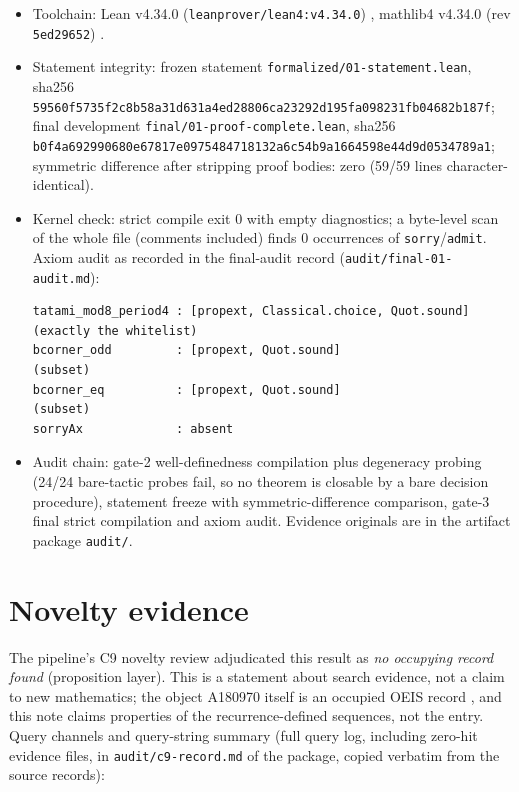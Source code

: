 \documentclass[11pt]{article}
\begin{document}
\begin{itemize}
\item Toolchain: Lean v4.34.0 (\texttt{leanprover/lean4:v4.34.0})
\cite{lean4}, mathlib4 v4.34.0 (rev \texttt{5ed29652}) \cite{mathlib}.
\item Statement integrity: frozen statement
\texttt{formalized/01-statement.lean}, sha256
\texttt{59560f5735f2c8b58a31d631a4ed28806ca23292d195fa098231fb04682b187f};
final development \texttt{final/01-proof-complete.lean}, sha256
\texttt{b0f4a692990680e67817e0975484718132a6c54b9a1664598e44d9d0534789a1};
symmetric difference after stripping proof bodies: zero (59/59 lines
character-identical).
\item Kernel check: strict compile exit 0 with empty diagnostics; a
byte-level scan of the whole file (comments included) finds 0 occurrences of
\texttt{sorry}/\texttt{admit}. Axiom audit as recorded in the final-audit
record (\texttt{audit/final-01-audit.md}):
\begin{verbatim}
tatami_mod8_period4 : [propext, Classical.choice, Quot.sound]  (exactly the whitelist)
bcorner_odd         : [propext, Quot.sound]                    (subset)
bcorner_eq          : [propext, Quot.sound]                    (subset)
sorryAx             : absent
\end{verbatim}
\item Audit chain: gate-2 well-definedness compilation plus degeneracy
probing (24/24 bare-tactic probes fail, so no theorem is closable by a bare
decision procedure), statement freeze with symmetric-difference comparison,
gate-3 final strict compilation and axiom audit. Evidence originals are in
the artifact package \texttt{audit/}.
\end{itemize}

\section{Novelty evidence}

The pipeline's C9 novelty review adjudicated this result as \emph{no
occupying record found} (proposition layer). This is a statement about
search evidence, not a claim to new mathematics; the object A180970 itself
is an occupied OEIS record \cite{oeis-a180970}, and this note claims
properties of the recurrence-defined sequences, not the entry. Query
channels and query-string summary (full query log, including zero-hit
evidence files, in \texttt{audit/c9-record.md} of the package, copied
verbatim from the source records):
\end{document}

